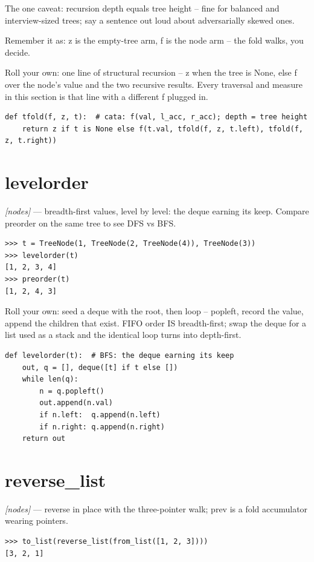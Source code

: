 \documentclass[11pt,letterpaper]{book}
\begin{document}
The one caveat: recursion depth equals tree height -- fine for balanced and interview-sized trees; say a sentence out loud about adversarially skewed ones.


Remember it as: z is the empty-tree arm, f is the node arm -- the fold walks, you decide.


Roll your own: one line of structural recursion -- z when the tree is None, else f over the node's value and the two recursive results. Every traversal and measure in this section is that line with a different f plugged in.

\begin{lstlisting}[style=code]
def tfold(f, z, t):  # cata: f(val, l_acc, r_acc); depth = tree height
    return z if t is None else f(t.val, tfold(f, z, t.left), tfold(f, z, t.right))
\end{lstlisting}

\section{levelorder}
\noindent\textit{[nodes]} --- breadth-first values, level by level: the deque earning its keep. Compare preorder on the same tree to see DFS vs BFS.
\begin{lstlisting}[style=spec]
>>> t = TreeNode(1, TreeNode(2, TreeNode(4)), TreeNode(3))
>>> levelorder(t)
[1, 2, 3, 4]
>>> preorder(t)
[1, 2, 4, 3]
\end{lstlisting}

Roll your own: seed a deque with the root, then loop -- popleft, record the value, append the children that exist. FIFO order IS breadth-first; swap the deque for a list used as a stack and the identical loop turns into depth-first.

\begin{lstlisting}[style=code]
def levelorder(t):  # BFS: the deque earning its keep
    out, q = [], deque([t] if t else [])
    while len(q):
        n = q.popleft()
        out.append(n.val)
        if n.left:  q.append(n.left)
        if n.right: q.append(n.right)
    return out
\end{lstlisting}

\section{reverse\_list}
\noindent\textit{[nodes]} --- reverse in place with the three-pointer walk; prev is a fold accumulator wearing pointers.
\begin{lstlisting}[style=spec]
>>> to_list(reverse_list(from_list([1, 2, 3])))
[3, 2, 1]
\end{lstlisting}
\end{document}
